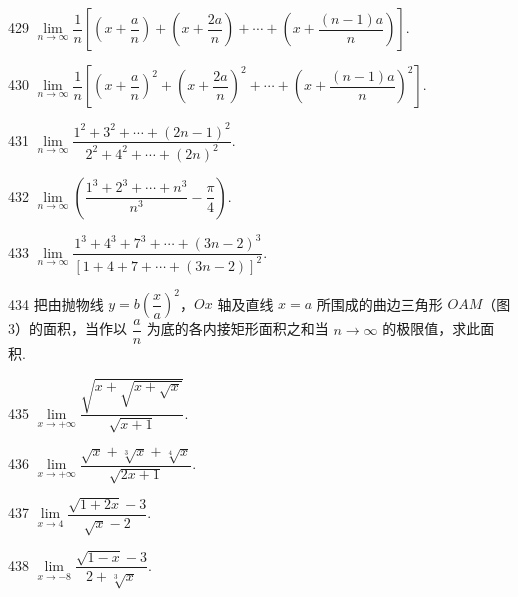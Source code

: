 \begin{prob}[S]{429}
$\lim\limits_{n \to \infty} \dfrac{1}{n} \left[\left(x + \dfrac{a}{n}\right) + \left(x + \dfrac{2a}{n}\right) + \cdots + \left(x + \dfrac{(n - 1)a}{n}\right)\right]$.
\end{prob}

\begin{prob}[M]{430}
$\lim\limits_{n \to \infty} \dfrac{1}{n} \left[\left(x + \dfrac{a}{n}\right)^2 + \left(x + \dfrac{2a}{n}\right)^2 + \cdots + \left(x + \dfrac{(n - 1)a}{n}\right)^2\right]$.
\end{prob}

\begin{prob}[S]{431}
$\lim\limits_{n \to \infty} \dfrac{1^2 + 3^2 + \cdots + (2n - 1)^2}{2^2 + 4^2 + \cdots + (2n)^2}$.
\end{prob}

\begin{prob}[M]{432}
$\lim\limits_{n \to \infty} \left(\dfrac{1^3 + 2^3 + \cdots + n^3}{n^3} - \dfrac{\pi}{4}\right)$.
\end{prob}

\begin{prob}[S]{433}
$\lim\limits_{n \to \infty} \dfrac{1^3 + 4^3 + 7^3 + \cdots + (3n - 2)^3}{[1 + 4 + 7 + \cdots + (3n - 2)]^2}$.
\end{prob}

\begin{prob}[M]{434}
把由抛物线 $y = b\left(\dfrac{x}{a}\right)^2$，$Ox$ 轴及直线 $x = a$ 所围成的曲边三角形 $OAM$（图 3）的面积，当作以 $\dfrac{a}{n}$ 为底的各内接矩形面积之和当 $n \to \infty$ 的极限值，求此面积.
\end{prob}


\begin{prob}[S]{435}
$\lim\limits_{x \to +\infty} \dfrac{\sqrt{x + \sqrt{x + \sqrt{x}}}}{\sqrt{x + 1}}$.
\end{prob}

\begin{prob}[S]{436}
$\lim\limits_{x \to +\infty} \dfrac{\sqrt{x} + \sqrt[3]{x} + \sqrt[4]{x}}{\sqrt{2x + 1}}$.
\end{prob}

\begin{prob}[S]{437}
$\lim\limits_{x \to 4} \dfrac{\sqrt{1 + 2x} - 3}{\sqrt{x} - 2}$.
\end{prob}

\begin{prob}[S]{438}
$\lim\limits_{x \to -8} \dfrac{\sqrt{1 - x} - 3}{2 + \sqrt[3]{x}}$.
\end{prob}

